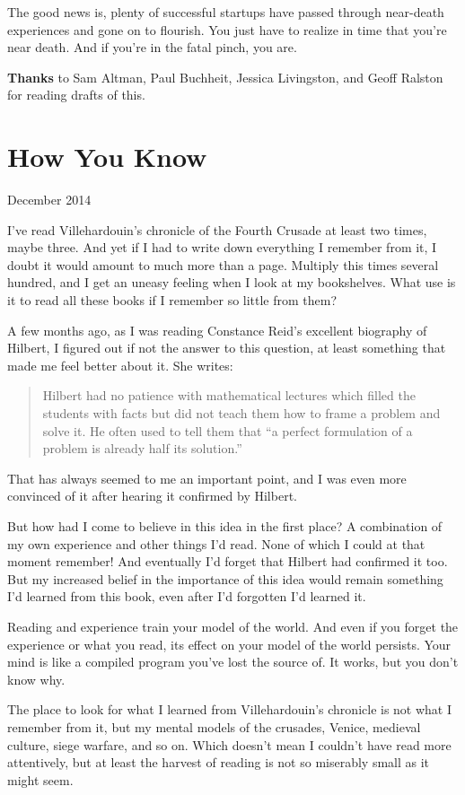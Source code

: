 \documentclass[12pt]{book}
\begin{document}
The good news is, plenty of successful startups have passed through
near-death experiences and gone on to flourish. You just have to realize
in time that you're near death. And if you're in the fatal pinch, you
are.


\textbf{Thanks} to Sam Altman, Paul Buchheit, Jessica Livingston, and
Geoff Ralston for reading drafts of this.
\chapter{How You Know}

December 2014

I've read Villehardouin's chronicle of the Fourth Crusade at least two
times, maybe three. And yet if I had to write down everything I remember
from it, I doubt it would amount to much more than a page. Multiply this
times several hundred, and I get an uneasy feeling when I look at my
bookshelves. What use is it to read all these books if I remember so
little from them?

A few months ago, as I was reading Constance Reid's excellent biography
of Hilbert, I figured out if not the answer to this question, at least
something that made me feel better about it. She writes:

\begin{quote}
Hilbert had no patience with mathematical lectures which filled the
students with facts but did not teach them how to frame a problem and
solve it. He often used to tell them that ``a perfect formulation of a
problem is already half its solution.''
\end{quote}

That has always seemed to me an important point, and I was even more
convinced of it after hearing it confirmed by Hilbert.

But how had I come to believe in this idea in the first place? A
combination of my own experience and other things I'd read. None of
which I could at that moment remember! And eventually I'd forget that
Hilbert had confirmed it too. But my increased belief in the importance
of this idea would remain something I'd learned from this book, even
after I'd forgotten I'd learned it.

Reading and experience train your model of the world. And even if you
forget the experience or what you read, its effect on your model of the
world persists. Your mind is like a compiled program you've lost the
source of. It works, but you don't know why.

The place to look for what I learned from Villehardouin's chronicle is
not what I remember from it, but my mental models of the crusades,
Venice, medieval culture, siege warfare, and so on. Which doesn't mean I
couldn't have read more attentively, but at least the harvest of reading
is not so miserably small as it might seem.
\end{document}

